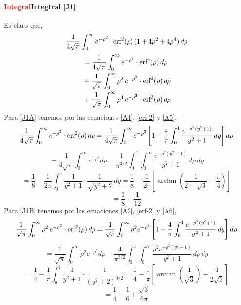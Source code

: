 \documentclass[12pt]{book}
\numberwithin{equation}{chapter}
\def\r{\rho}
\def\erf{\hbox{erf}}
\begin{document}
\paragraph{\textcolor{red}{Integral}Integtral \eqref{J1}}
Es claro que,
$$ \frac{1}{4\sqrt{\pi}} \int_{0}^{\infty} e^{-\r^{2}}\cdot \erf^{2}(\r)\, ( 1+4\r^{2}+4\r^{4} )\, d\r $$
\begin{subequations}
\begin{align}
&=\frac{1}{4\sqrt{\pi}} \int_{0}^{\infty} e^{-\r^{2}}\cdot \erf^{2}(\r)\, d\r \label{J1A} \\
&+\frac{1}{\sqrt{\pi}} \int_{0}^{\infty} \r^{2} \,e^{-\r^{2}}\cdot \erf^{2}(\r)\, d\r \label{J1B} \\
&+\frac{1}{\sqrt{\pi}} \int_{0}^{\infty} \r^{4} \,e^{-\r^{2}}\cdot \erf^{2}(\r)\, d\r \label{J1C}
\end{align}
\end{subequations}
Para \eqref{J1A} tenemos por las ecuaciones \eqref{A1}, \eqref{erf-2} y \eqref{A5},
$$ \frac{1}{4\sqrt{\pi}} \int_{0}^{\infty} e^{-\r^{2}}\cdot \erf^{2}(\r)\, d\r = \frac{1}{4\sqrt{\pi}} \int_{0}^{\infty} e^{-\r^{2}} \left[1-\frac{4}{\pi} \int_{0}^{1} \frac{e^{-\r^{2}(y^{2}+1)}}{y^{2}+1}\, dy \right]  d\r  $$
$$= \frac{1}{4\sqrt{\pi}} \int_{0}^{\infty} e^{-\r^{2}} d\r -\frac{1}{\pi^{3/2}} \int_{0}^{1} \int_{0}^{\infty} \frac{e^{-\r^{2}(y^{2}+1)}}{y^{2}+1}\, d\r \, dy $$
$$ = \frac{1}{8} - \frac{1}{2\pi} \int_{0}^{1} \frac{1}{y^{2}+1}\cdot \frac{1}{\sqrt{y^{2}+2}}\, dy = \frac{1}{8}- \frac{1}{2\pi} \left[ \arctan\left( \frac{1}{2-\sqrt{3}} -\frac{\pi}{4} \right) \right] $$
\begin{equation}\label{r1}
= \frac{1}{8} - \frac{1}{12}
\end{equation}
Para \eqref{J1B} tenemos por las ecuaciones \eqref{A2}, \eqref{erf-2} y \eqref{A6},
$$ \frac{1}{\sqrt{\pi}} \int_{0}^{\infty} \r^{2} \,e^{-\r^{2}}\cdot \erf^{2}(\r)\, d\r= \frac{1}{\sqrt{\pi}} \int_{0}^{\infty}\r^{2} e^{-\r^{2}} \left[1-\frac{4}{\pi} \int_{0}^{1} \frac{e^{-\r^{2}(y^{2}+1)}}{y^{2}+1}\, dy \right]  d\r $$
$$ = \frac{1}{\sqrt{\pi}} \int_{0}^{\infty} \r^{2} e^{-\r^{2}} d\r -\frac{4}{\pi^{3/2}} \int_{0}^{1} \int_{0}^{\infty} \frac{\r^{2} e^{-\r^{2}(y^{2}+1)}}{y^{2}+1}\, d\r \, dy $$
$$= \frac{1}{4} -\frac{1}{\pi} \int_{0}^{1} \frac{1}{y^{2}+1}\cdot \frac{1}{(y^{2}+2)^{3/2}} = \frac{1}{4} -\frac{1}{\pi} \left[ \arctan \left( \frac{1}{\sqrt{3}} \right) - \frac{1}{2\sqrt{3}} \right] $$
\begin{equation}\label{r2}
= \frac{1}{4} -\frac{1}{6} + \frac{\sqrt{3}}{6\pi}
\end{equation}
\end{document}

